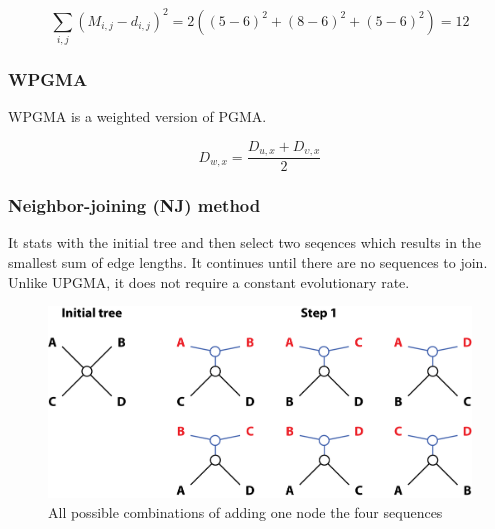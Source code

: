 \[
\sum_{i,j}{}(M_{i,j} - d_{i,j})^2 = 2((5-6)^2 + (8-6)^2 + (5-6)^2) =12
\]

%
%
\subsubsection*{WPGMA}
WPGMA is a weighted version of PGMA.

\[
D_{w,x}=\dfrac{D_{u,x} + D_{\upsilon,x}}{2}
\]

%
%
\subsubsection*{Neighbor-joining (NJ) method}
It stats with the initial tree and then select two seqences which results in the smallest sum of edge lengths. It continues until there are no sequences to join. Unlike UPGMA, it does not require a constant evolutionary rate.

\begin{figure}[H]
  \centering
      \includegraphics[width=0.75 \textwidth]{fig09/neighbor_joining.png}
  \caption{All possible combinations of adding one node the four sequences}
\end{figure}

%
%
